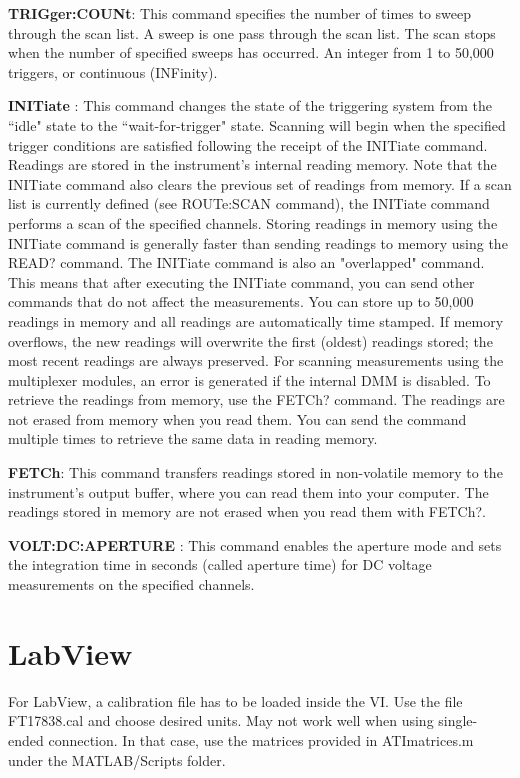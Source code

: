 \documentclass[a4paper]{article}
\begin{document}
{\textbf{TRIGger:COUNt}: This command specifies the number of times to sweep through the scan list. A sweep is one pass through the scan list. The scan stops when the number of specified sweeps has occurred. An integer from 1 to 50,000 triggers, or continuous (INFinity).

\textbf{INITiate} : This command changes the state of the triggering system from the ``idle" state to the ``wait-for-trigger" state. Scanning will begin when the specified trigger conditions are satisfied following the receipt of the INITiate command. Readings are stored in the instrument's internal reading memory. Note that the INITiate command also clears the previous set of readings from memory.
If a scan list is currently defined (see ROUTe:SCAN command), the INITiate command performs a scan of the specified channels.
Storing readings in memory using the INITiate command is generally faster than sending readings to memory using the READ? command. The INITiate command is also an "overlapped" command. This means that after executing the INITiate command, you can send other commands that do not affect the measurements.
You can store up to 50,000 readings in memory and all readings are automatically time stamped. If memory overflows, the new readings will overwrite the first (oldest) readings stored; the most recent readings are always preserved.
For scanning measurements using the multiplexer modules, an error is generated if the internal DMM is disabled.
To retrieve the readings from memory, use the FETCh? command.
The readings are not erased from memory when you read them.
You can send the command multiple times to retrieve the same data in reading memory.

\textbf{FETCh}: This command transfers readings stored in non-volatile memory to the instrument's output buffer, where you can read them into your computer. The readings stored in memory are not erased when you read them with FETCh?.

\textbf{VOLT:DC:APERTURE} : This command enables the aperture mode and sets the integration time in seconds (called aperture time) for DC voltage measurements on the specified channels.


\section{LabView}

For LabView, a calibration file has to be loaded inside the VI. Use the file FT17838.cal and choose desired units. May not work well when using single-ended connection. In that case, use the matrices provided in ATImatrices.m under the MATLAB/Scripts folder.
 
}
\end{document}
